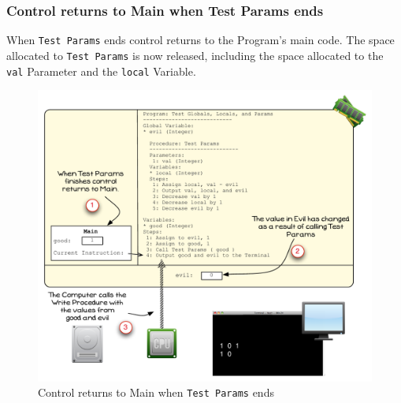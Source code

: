 \clearpage

\subsubsection{Control returns to Main when Test Params ends} %
\label{ssub:control_returns_to_main_when_test_params_ends}

When \texttt{Test Params} ends control returns to the Program's main code. The space allocated to \texttt{Test Params} is now released, including the space allocated to the \texttt{val} Parameter and the \texttt{local} Variable.

\begin{figure}[htbp]
   \centering
   \includegraphics[width=\textwidth]{./topics/storing-using-data/images/vis-globals-6} 
   \caption{Control returns to Main when \texttt{Test Params} ends}
   \label{fig:vis-globals-6}
\end{figure}

